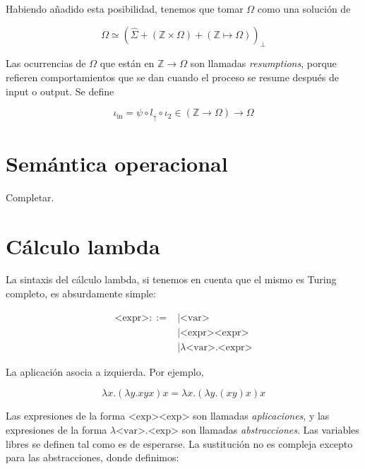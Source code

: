 \documentclass[article, 12pt]{article}
\begin{document}
Habiendo añadido esta posibilidad, tenemos que tomar $\Omega$ como una solución
de 

\begin{equation*}
  \Omega \simeq \left( \hat{\Sigma} + \left( \mathbb{Z} \times \Omega \right) +
  \left( \mathbb{Z} \mapsto \Omega \right) \right)_\bot 
\end{equation*}

Las ocurrencias de $\Omega$ que están en $\mathbb{Z} \to \Omega$ son llamadas
\textit{resumptions}, porque refieren comportamientos que se dan cuando el
proceso se resume después de input o output. Se define 

\begin{equation*}
  \iota_{\text{in}} = \psi \circ l_{\uparrow} \circ \iota_2 \in \left(
  \mathbb{Z} \to \Omega \right) \to \Omega
\end{equation*}

\newpage
\section{Semántica operacional}

Completar. 

\section{Cálculo lambda}

La sintaxis del cálculo lambda, si tenemos en cuenta que el mismo es Turing
completo, es absurdamente simple: 

\begin{align*}
  \text{<expr>} ::= &\mid \text{<var>} \\ 
                    &\mid \text{<expr><expr>} \\ 
                    &\mid \lambda \text{<var>}.\text{<expr>}
\end{align*}

La aplicación asocia a izquierda. Por ejemplo, 

\begin{equation*}
  \lambda x . (\lambda y. xyx)x = \lambda x.(\lambda y.(xy)x)x
\end{equation*}

Las expresiones de la forma $\text{<exp><exp>}$ son llamadas
\textit{aplicaciones}, y las expresiones de la forma
$\lambda\text{<var>}.\text{<exp>}$ son llamadas \textit{abstracciones}. Las
variables libres se definen tal como es de esperarse. La sustitución no es
compleja excepto para las abstracciones, donde definimos:
\end{document}
